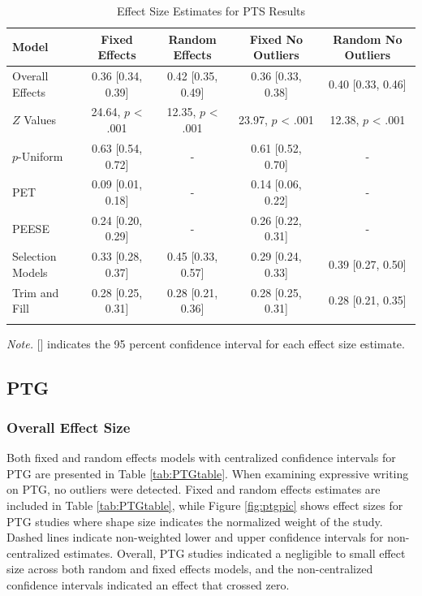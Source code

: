 \documentclass[man, mask]{apa6}
\theoremstyle{definition}
\theoremstyle{definition}
\theoremstyle{definition}
\theoremstyle{remark}
\begin{document}
\begin{table}[tbp]
\begin{center}
\begin{threeparttable}
\caption{\label{tab:PTStable}Effect Size Estimates for PTS Results}
\small{
\begin{tabular}{lcccc}
\toprule
Model & Fixed Effects & Random Effects & Fixed No Outliers & Random No Outliers\\
\midrule
Overall Effects & 0.36 [0.34, 0.39] & 0.42 [0.35, 0.49] & 0.36 [0.33, 0.38] & 0.40 [0.33, 0.46]\\
$Z$ Values & 24.64, $p$ < .001 & 12.35, $p$ < .001 & 23.97, $p$ < .001 & 12.38, $p$ < .001\\
$p$-Uniform & 0.63 [0.54, 0.72] & - & 0.61 [0.52, 0.70] & -\\
PET & 0.09 [0.01, 0.18] & - & 0.14 [0.06, 0.22] & -\\
PEESE & 0.24 [0.20, 0.29] & - & 0.26 [0.22, 0.31] & -\\
Selection Models & 0.33 [0.28, 0.37] & 0.45 [0.33, 0.57] & 0.29 [0.24, 0.33] & 0.39 [0.27, 0.50]\\
Trim and Fill & 0.28 [0.25, 0.31] & 0.28 [0.21, 0.36] & 0.28 [0.25, 0.31] & 0.28 [0.21, 0.35]\\
\bottomrule
\addlinespace
\end{tabular}
}
\begin{tablenotes}[para]
\textit{Note.} [] indicates the 95 percent confidence interval for each effect size estimate.
\end{tablenotes}
\end{threeparttable}
\end{center}
\end{table}

\subsection{PTG}\label{ptg}

\subsubsection{Overall Effect Size}\label{overall-effect-size-1}

Both fixed and random effects models with centralized confidence
intervals for PTG are presented in Table \ref{tab:PTGtable}. When
examining expressive writing on PTG, no outliers were detected. Fixed
and random effects estimates are included in Table \ref{tab:PTGtable},
while Figure \ref{fig:ptgpic} shows effect sizes for PTG studies where
shape size indicates the normalized weight of the study. Dashed lines
indicate non-weighted lower and upper confidence intervals for
non-centralized estimates. Overall, PTG studies indicated a negligible
to small effect size across both random and fixed effects models, and
the non-centralized confidence intervals indicated an effect that
crossed zero.
\end{document}
